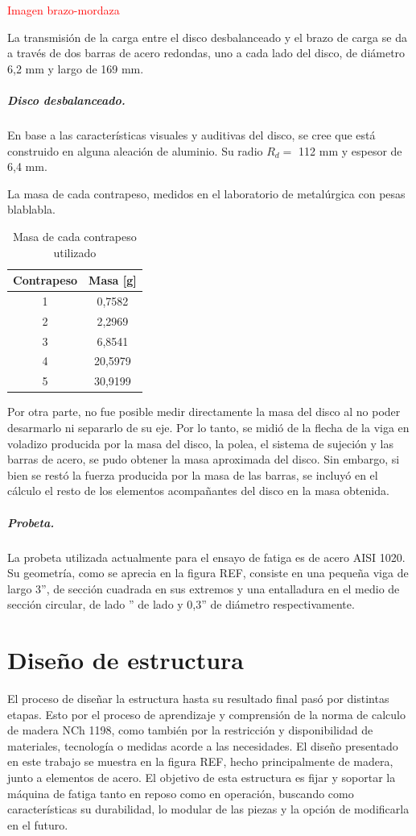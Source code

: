 \textcolor{red}{Imagen brazo-mordaza}

La transmisión de la carga entre el disco desbalanceado y el brazo de carga se da a través de dos barras de acero redondas, uno a cada lado del disco, de diámetro 6,2 mm y largo de 169 mm.

\subparagraph{Disco desbalanceado.}
En base a las características visuales y auditivas del disco, se cree que está construido en alguna aleación de aluminio. Su radio $R_d =$ 112 mm y espesor de 6,4 mm. 

La masa de cada contrapeso, medidos en el laboratorio de metalúrgica con pesas blablabla.
\begin{table}[H]
\centering
\begin{tabular}{@{}cc@{}}
\toprule
Contrapeso & Masa {[}g{]} \\ \midrule
1          & 0,7582       \\
2          & 2,2969       \\
3          & 6,8541       \\
4          & 20,5979      \\
5          & 30,9199      \\ \bottomrule
\end{tabular}
\caption{Masa de cada contrapeso utilizado}
\label{tab:masa_contrapesos}
\end{table}

Por otra parte, no fue posible medir directamente la masa del disco al no poder desarmarlo ni separarlo de su eje. Por lo tanto, se midió de la flecha de la viga en voladizo producida por la masa del disco, la polea, el sistema de sujeción y las barras de acero, se pudo obtener la masa aproximada del disco. Sin embargo, si bien se restó la fuerza producida por la masa de las barras, se incluyó en el cálculo el resto de los elementos acompañantes del disco en la masa obtenida.

\subparagraph{Probeta.} La probeta utilizada actualmente para el ensayo de fatiga es de acero AISI 1020. Su geometría, como se aprecia en la figura REF, consiste en una pequeña viga de largo 3'', de sección cuadrada en sus extremos y una entalladura en el medio de sección circular, de lado '' de lado y 0,3'' de diámetro respectivamente.
 
\section{Diseño de estructura}
El proceso de diseñar la estructura hasta su resultado final pasó por distintas etapas. Esto por el proceso de aprendizaje y comprensión de la norma de calculo de madera NCh 1198, como también por la restricción y disponibilidad de materiales, tecnología o medidas acorde a las necesidades. El diseño presentado en este trabajo se muestra en la figura REF, hecho principalmente de madera, junto a elementos de acero. El objetivo de esta estructura es fijar y soportar la máquina de fatiga tanto en reposo como en operación, buscando como características su durabilidad, lo modular de las piezas y la opción de modificarla en el futuro.

